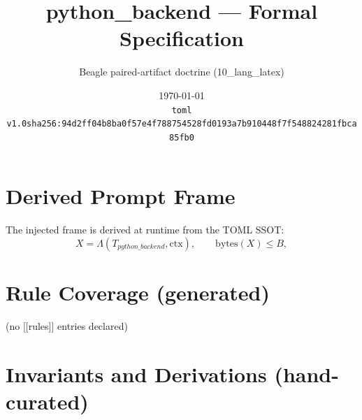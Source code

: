 \documentclass[11pt]{article}
\title{python\_backend --- Formal Specification}
\author{Beagle paired-artifact doctrine (10\_lang\_latex)}
\date{\today\\ \texttt{toml v1.0\quad sha256:94d2ff04b8ba0f57e4f788754528fd0193a7b910448f7f548824281fbca85fb0}}
\begin{document}
\maketitle

\section{Derived Prompt Frame}
The injected frame is derived at runtime from the TOML SSOT:
\begin{equation}
  X = \Lambda(T_{python\_backend}, \mathrm{ctx}), \qquad \mathrm{bytes}(X) \le B,
  \label{lbl:derive-frame}
\end{equation}

\section{Rule Coverage (generated)}
(no [[rules]] entries declared)

\section{Invariants and Derivations (hand-curated)}
\end{document}
